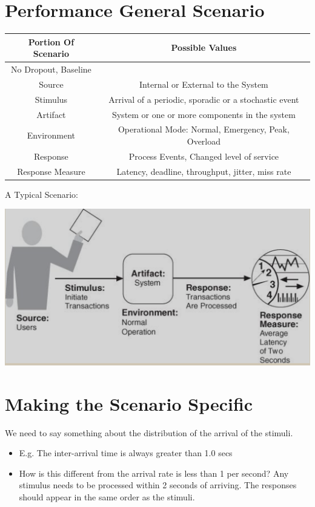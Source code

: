 \documentclass{report}
\begin{document}
\section{Performance General Scenario}
\begin{tabular}{||c | c||} 
 \hline
 Portion Of Scenario & Possible Values \\ [0.5ex] 
 \hline\hline
 No Dropout, Baseline &  \\ 
 \hline
 Source & Internal or External to the System \\
 \hline
 Stimulus & Arrival of a periodic, sporadic or a stochastic event \\
 \hline
 Artifact & System or one or more components in the system \\
 \hline
 Environment & Operational Mode: Normal, Emergency, Peak, Overload  \\
 \hline
 Response & Process Events, Changed level of service \\ 
 \hline
 Response Measure & Latency, deadline, throughput, jitter, miss rate \\
 \hline
\end{tabular}
\newline
\newline
A Typical Scenario:
\begin{center}
\includegraphics[scale=0.6]{sad.png}
\end{center}

\section{Making the Scenario Specific}
We need to say something about the distribution of the arrival of the stimuli.
\begin{itemize}
\item{E.g. The inter-arrival time is always greater than 1.0 secs}
\item{How is this different from the arrival rate is less than 1 per second?}
Any stimulus needs to be processed within 2 seconds of arriving.
The responses should appear in the same order as the stimuli.
\end{itemize}
\end{document}
